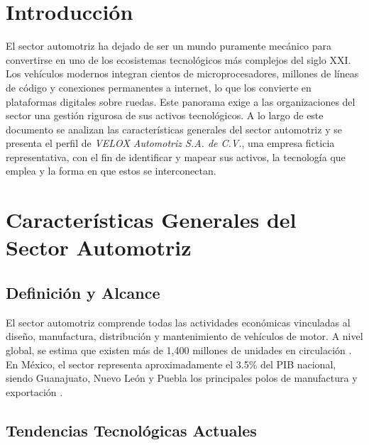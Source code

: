 \documentclass[letterpaper,11pt]{article}
\begin{document}


\newpage
{\hypersetup{linkcolor=black}\tableofcontents}


\newpage
\setcounter{page}{1}
\singlespacing

\section{Introducción}

El sector automotriz ha dejado de ser un mundo puramente mecánico para convertirse en uno de los ecosistemas tecnológicos más complejos del siglo XXI. Los vehículos modernos integran cientos de microprocesadores, millones de líneas de código y conexiones permanentes a internet, lo que los convierte en plataformas digitales sobre ruedas. Este panorama exige a las organizaciones del sector una gestión rigurosa de sus activos tecnológicos. A lo largo de este documento se analizan las características generales del sector automotriz y se presenta el perfil de \textit{VELOX Automotriz S.A. de C.V.}, una empresa ficticia representativa, con el fin de identificar y mapear sus activos, la tecnología que emplea y la forma en que estos se interconectan.

\section{Características Generales del Sector Automotriz}

\subsection{Definición y Alcance}

El sector automotriz comprende todas las actividades económicas vinculadas al diseño, manufactura, distribución y mantenimiento de vehículos de motor. A nivel global, se estima que existen más de 1{,}400 millones de unidades en circulación \autocite{upstream-security-report}. En México, el sector representa aproximadamente el 3.5\% del PIB nacional, siendo Guanajuato, Nuevo León y Puebla los principales polos de manufactura y exportación \autocite{cisa-automotive-2024}.

\subsection{Tendencias Tecnológicas Actuales}
\end{document}
